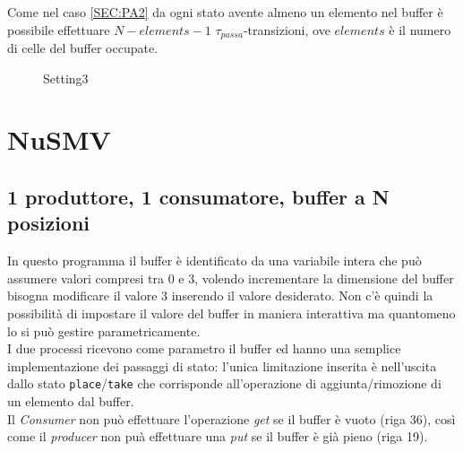 \documentclass[a4paper]{article}
\begin{document}
Come nel caso \ref{SEC:PA2} da ogni stato avente almeno un elemento nel buffer è possibile effettuare $N - elements - 1$ $\tau_{passa}$-transizioni, ove $elements$ è il numero di celle del buffer occupate.\\
\begin{figure}[!ht]
\centering
{}
\caption{Setting3} \label{FIG:PA3_DG}
\end{figure}
\newpage

\section{NuSMV}
\subsection{1 produttore, 1 consumatore, buffer a N posizioni}

In questo programma il buffer è identificato da una variabile intera che può assumere valori compresi tra 0 e 3, volendo incrementare la dimensione del buffer bisogna modificare il valore 3 inserendo il valore desiderato.
Non c'è quindi la possibilità di impostare il valore del buffer in maniera interattiva ma quantomeno lo si può gestire parametricamente.\\
I due processi ricevono come parametro il buffer ed hanno una semplice implementazione dei passaggi di stato: l'unica limitazione inserita è nell'uscita dallo stato \texttt{place}/\texttt{take} che corrisponde all'operazione di aggiunta/rimozione di un elemento dal buffer.\\
Il \textit{Consumer} non può effettuare l'operazione \textit{get} se il buffer è vuoto (riga 36), così come il \textit{producer} non puà effettuare una \textit{put} se il buffer è già pieno (riga 19).
\end{document}
